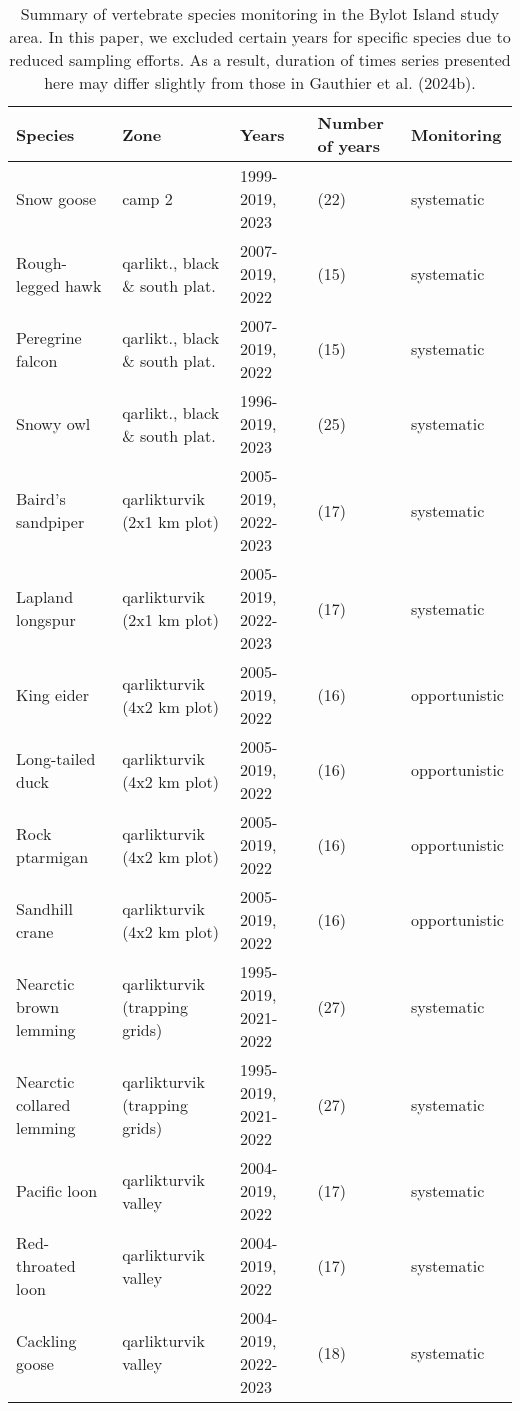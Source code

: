 \begin{table}[ht]
\centering
\caption{Summary of vertebrate species monitoring in the Bylot Island study area. In this paper, we excluded certain years for specific species due to reduced sampling efforts. As a result, duration of times series presented here may differ slightly from those in Gauthier et al. (2024b).} 
\label{table:table_species_year_monitoring}
\begingroup\fontsize{8pt}{10pt}\selectfont
\begin{tabularx}{\textwidth}{lllll}
  \hline
Species & Zone & Years & Number of years & Monitoring \\ 
  \hline
Snow goose & camp 2 & 1999-2019, 2023 & (22) & systematic \\ 
  Rough-legged hawk & qarlikt., black \& south plat. & 2007-2019, 2022 & (15) & systematic \\ 
  Peregrine falcon & qarlikt., black \& south plat. & 2007-2019, 2022 & (15) & systematic \\ 
  Snowy owl & qarlikt., black \& south plat. & 1996-2019, 2023 & (25) & systematic \\ 
  Baird's sandpiper & qarlikturvik (2x1 km plot) & 2005-2019, 2022-2023 & (17) & systematic \\ 
  Lapland longspur & qarlikturvik (2x1 km plot) & 2005-2019, 2022-2023 & (17) & systematic \\ 
  King eider & qarlikturvik (4x2 km plot) & 2005-2019, 2022 & (16) & opportunistic \\ 
  Long-tailed duck & qarlikturvik (4x2 km plot) & 2005-2019, 2022 & (16) & opportunistic \\ 
  Rock ptarmigan & qarlikturvik (4x2 km plot) & 2005-2019, 2022 & (16) & opportunistic \\ 
  Sandhill crane & qarlikturvik (4x2 km plot) & 2005-2019, 2022 & (16) & opportunistic \\ 
  Nearctic brown lemming & qarlikturvik (trapping grids) & 1995-2019, 2021-2022 & (27) & systematic \\ 
  Nearctic collared lemming & qarlikturvik (trapping grids) & 1995-2019, 2021-2022 & (27) & systematic \\ 
  Pacific loon & qarlikturvik valley & 2004-2019, 2022 & (17) & systematic \\ 
  Red-throated loon & qarlikturvik valley & 2004-2019, 2022 & (17) & systematic \\ 
  Cackling goose & qarlikturvik valley & 2004-2019, 2022-2023 & (18) & systematic \\ 

\end{tabularx}
\end{table}
